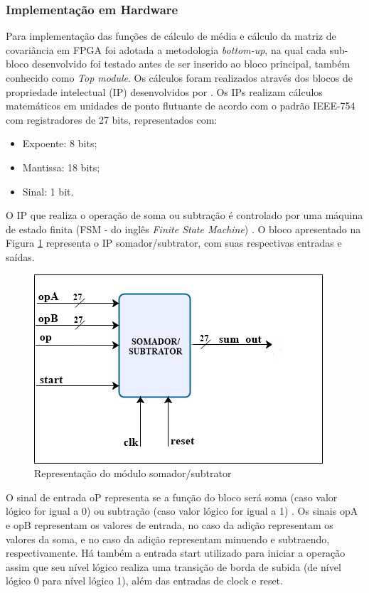 \subsubsection{Implementação em Hardware}
Para implementação das funções de cálculo de média e cálculo da matriz de covariância em FPGA foi adotada a metodologia \textit{bottom-up}, na qual cada sub-bloco desenvolvido foi testado antes de ser inserido ao bloco principal, também conhecido como \textit{Top module}.
Os cálculos foram realizados através dos blocos de propriedade intelectual (IP) desenvolvidos por \cite{munoz2010tradeoff}. Os IPs realizam cálculos matemáticos em unidades de ponto flutuante de acordo com o padrão IEEE-754 \cite{IEEE745} com registradores de 27 bits, representados com:
\begin{itemize}
	\item Expoente: 8 bits;
	\item Mantissa: 18 bits;
	\item Sinal: 1 bit.
\end{itemize}

O IP que realiza o operação de soma ou subtração é controlado por uma máquina de estado finita (FSM - do inglês \textit{Finite State Machine}) \cite{munoz2010tradeoff}. O bloco apresentado na Figura \ref{somador_27} representa o IP somador/subtrator, com suas respectivas entradas e saídas.

\begin{figure}[h]
	\centering
	\includegraphics[keepaspectratio=true,scale=1]{figuras/bloco_soma.PNG}
	\caption{Representação do módulo somador/subtrator}
	\label{somador_27}
\end{figure}

O sinal de entrada oP representa se a função do bloco será soma (caso valor lógico for igual a 0) ou subtração (caso valor lógico for igual a 1) \cite{munoz2010tradeoff}. Os sinais opA e opB representam os valores de entrada, no caso da adição representam os valores da soma, e no caso da adição representam minuendo e subtraendo, respectivamente. Há também a entrada start utilizado para iniciar a operação assim que seu nível lógico realiza uma transição de borda de subida (de nível lógico 0 para nível lógico 1), além das entradas de clock e reset. 

